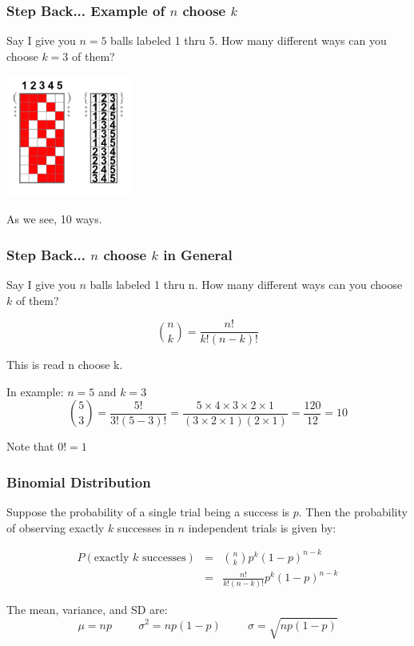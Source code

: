 \documentclass[handout]{beamer}
\newcommand{\blue}[1]{\textcolor{blue2}{#1}}
\begin{document}
\begin{frame}
\frametitle{Step Back... Example of $n$ choose $k$}
Say I give you $n=5$ balls labeled 1 thru 5.  How many different ways can you choose $k=3$ of them?

\begin{center}
\pause\includegraphics[height=4cm]{figure/choose.png}
\end{center}

As we see, 10 ways.  

\end{frame}



\begin{frame}
\frametitle{Step Back... $n$ choose $k$ in General}
Say I give you $n$ balls labeled 1 thru n.  How many different ways can you choose $k$ of them?

\[
{n \choose k} = \frac{n!}{k!(n-k)!}
\]

This is read \blue{n choose k}.  

\pause \vspace{0.5cm}

In example: $n=5$ and $k=3$
\[
{5 \choose 3} = \frac{5!}{3!(5-3)!} = \frac{5 \times 4 \times 3 \times 2 \times 1}{(3 \times 2 \times 1)(2 \times 1)} = \frac{120}{12} = 10
\]

Note that $0!=1$

\end{frame}


\begin{frame}
\frametitle{Binomial Distribution}
Suppose the probability of a single trial being a success is $p$.  Then the probability of observing exactly $k$ successes in $n$ independent trials is given by:

\pause\begin{eqnarray*}
P(\mbox{exactly $k$ successes}) &=& {n \choose k} p^k (1-p)^{n-k}\\
&=& \frac{n!}{k!(n-k)!}p^k (1-p)^{n-k}
\end{eqnarray*}

\pause The mean, variance, and SD are:
\[
\mu = np \hspace{1cm} \sigma^2 = np(1-p) \hspace{1cm} \sigma = \sqrt{np(1-p)}
\]

\end{frame}
\end{document}
